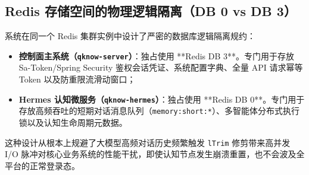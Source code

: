 \subsection{Redis 存储空间的物理逻辑隔离（DB 0 vs DB 3）}
系统在同一个 Redis 集群实例中设计了严密的数据库逻辑隔离规约：
\begin{itemize}
    \item \textbf{控制面主系统（\texttt{qknow-server}）}：独占使用 **Redis DB 3**。专门用于存放 Sa-Token/Spring Security 鉴权会话凭证、系统配置字典、全量 API 请求幂等 Token 以及防重限流滑动窗口；
    \item \textbf{Hermes 认知微服务（\texttt{qknow-hermes}）}：独占使用 **Redis DB 0**。专门用于存放高频吞吐的短期对话消息队列（\texttt{memory:short:*}）、多智能体分布式执行锁以及认知生命周期元数据。
\end{itemize}
这种设计从根本上规避了大模型高频对话历史频繁触发 \texttt{lTrim} 修剪带来高并发 I/O 脉冲对核心业务系统的性能干扰，即使认知节点发生崩溃重置，也不会波及全平台的正常登录态。
